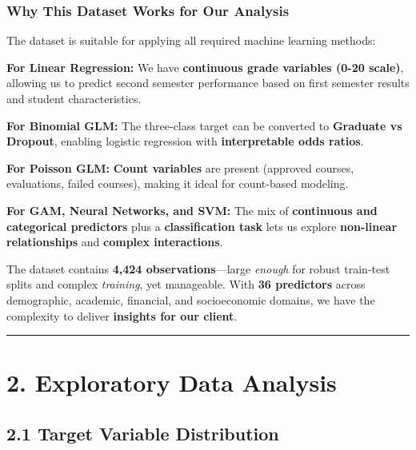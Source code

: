 \documentclass[
]{article}
\begin{document}
\subsubsection{Why This Dataset Works for Our
Analysis}\label{why-this-dataset-works-for-our-analysis}

The dataset is suitable for applying all required machine learning
methods:

\textbf{For Linear Regression:} We have \textbf{continuous grade
variables (0-20 scale)}, allowing us to predict second semester
performance based on first semester results and student characteristics.

\textbf{For Binomial GLM:} The three-class target can be converted to
\textbf{Graduate vs Dropout}, enabling logistic regression with
\textbf{interpretable odds ratios}.

\textbf{For Poisson GLM:} \textbf{Count variables} are present (approved
courses, evaluations, failed courses), making it ideal for count-based
modeling.

\textbf{For GAM, Neural Networks, and SVM:} The mix of
\textbf{continuous and categorical predictors} plus a
\textbf{classification task} lets us explore \textbf{non-linear
relationships} and \textbf{complex interactions}.

The dataset contains \textbf{4,424 observations}---large \emph{enough}
for robust train-test splits and complex \emph{training}, yet
manageable. With \textbf{36 predictors} across demographic, academic,
financial, and socioeconomic domains, we have the complexity to deliver
\textbf{insights for our client}.

\begin{center}\rule{0.5\linewidth}{0.5pt}\end{center}

\section{2. Exploratory Data Analysis}\label{exploratory-data-analysis}

\subsection{2.1 Target Variable
Distribution}\label{target-variable-distribution}
\end{document}
